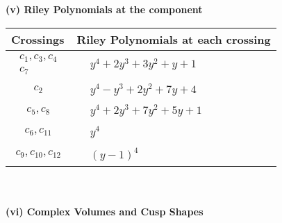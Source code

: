 \documentclass[1p]{elsarticle_modified}
\theoremstyle{definition}
\begin{document}
\newpage\renewcommand{\arraystretch}{1}
\flushleft \textbf{(v) Riley Polynomials at the component}\newline \\
\begin{tabular}{m{50pt}|m{274pt}}
Crossings & \hspace{64pt}Riley Polynomials at each crossing \\
\hline $$\begin{aligned}c_{1},c_{3},c_{4}\\c_{7}\end{aligned}$$&$\begin{aligned}
&y^4+2 y^3+3 y^2+y+1
\end{aligned}$\\
\hline $$\begin{aligned}c_{2}\end{aligned}$$&$\begin{aligned}
&y^4- y^3+2 y^2+7 y+4
\end{aligned}$\\
\hline $$\begin{aligned}c_{5},c_{8}\end{aligned}$$&$\begin{aligned}
&y^4+2 y^3+7 y^2+5 y+1
\end{aligned}$\\
\hline $$\begin{aligned}c_{6},c_{11}\end{aligned}$$&$\begin{aligned}
&y^4
\end{aligned}$\\
\hline $$\begin{aligned}c_{9},c_{10},c_{12}\end{aligned}$$&$\begin{aligned}
&(y-1)^4
\end{aligned}$\\
\hline
\end{tabular}\\~\\
\newpage\flushleft \textbf{(vi) Complex Volumes and Cusp Shapes}
\end{document}
